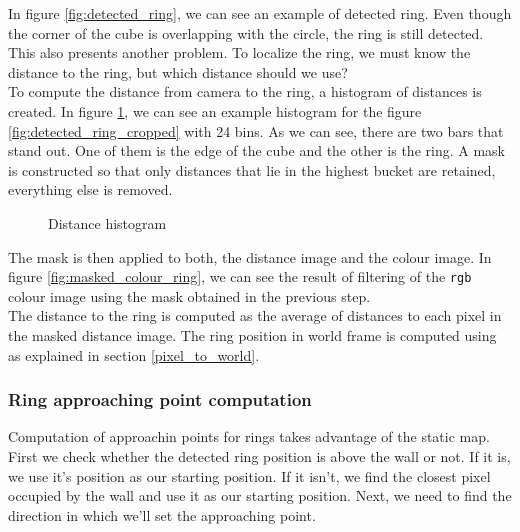 \documentclass[12pt,a4paper]{article}
\begin{document}
	In figure \ref{fig:detected_ring}, we can see an example of detected ring. Even though the corner of the cube is overlapping with the circle, the ring is still detected. This also presents another problem. To localize the ring, we must know the distance to the ring, but which distance should we use? \\
	
	To compute the distance from camera to the ring, a histogram of distances is created. In figure \ref{fig:distance_histogram}, we can see an example histogram for the figure \ref{fig:detected_ring_cropped} with 24 bins. As we can see, there are two bars that stand out. One of them is the edge of the cube and the other is the ring. A mask is constructed so that only distances that lie in the highest bucket are retained, everything else is removed. \\
	
	\begin{figure}[H]
		\centering
		\caption{Distance histogram}
		\label{fig:distance_histogram}
	\end{figure}

	The mask is then applied to both, the distance image and the colour image. In figure \ref{fig:masked_colour_ring}, we can see the result of filtering of the \texttt{rgb} colour image using the mask obtained in the previous step. \\

	The distance to the ring is computed as the average of distances to each pixel in the masked distance image. The ring position in world frame is computed using as explained in section \ref{pixel_to_world}. \\

	\subsubsection{Ring approaching point computation}
	Computation of approachin points for rings takes advantage of the static map. First we check whether the detected ring position is above the wall or not. If it is, we use it's position as our starting position. If it isn't, we find the closest pixel occupied by the wall and use it as our starting position. Next, we need to find the direction in which we'll set the approaching point. \\
\end{document}
